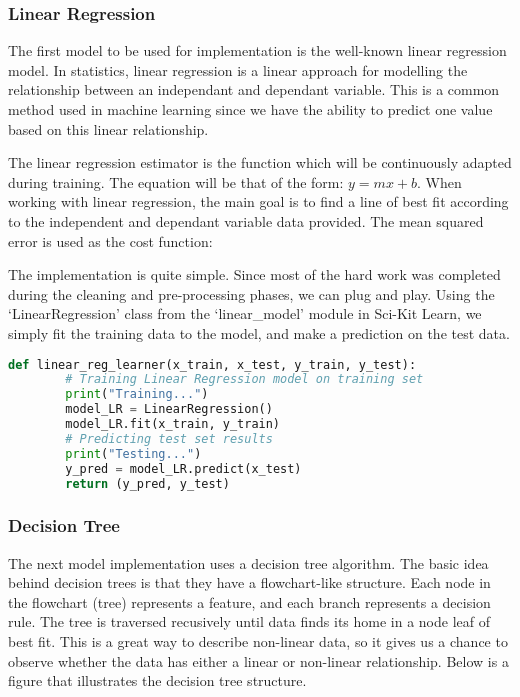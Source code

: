 \documentclass[12pt]{article}
\renewcommand{\baselinestretch}{2}
\begin{document}
        \subsubsection{Linear Regression}
        The first model to be used for implementation is the well-known linear regression model. In statistics, linear regression is a linear approach 
        for modelling the relationship between an independant and dependant variable. This is a common method used in machine learning since we have the 
        ability to predict one value based on this linear relationship. 

        The linear regression estimator is the function which will be continuously adapted during training. The equation will be that of the form: $y = mx + b$.
        When working with linear regression, the main goal is to find a line of best fit according to the independent and dependant variable data provided. The 
        mean squared error is used as the cost function:
        \begin{center}
            \Large {}
        \end{center}
        \normalsize

        The implementation is quite simple. Since most of the hard work was completed during the cleaning and pre-processing phases, we can plug 
        and play. Using the `LinearRegression' class from the `linear\_model' module in Sci-Kit Learn, we simply fit the training data to the model, and 
        make a prediction on the test data. 

        \renewcommand{\baselinestretch}{1.5}
        \begin{lstlisting}[language=Python, caption=Linear regression implementation]
    def linear_reg_learner(x_train, x_test, y_train, y_test):
        # Training Linear Regression model on training set
        print("Training...")
        model_LR = LinearRegression()
        model_LR.fit(x_train, y_train)
        # Predicting test set results
        print("Testing...")
        y_pred = model_LR.predict(x_test)
        return (y_pred, y_test)
        \end{lstlisting}
        \renewcommand{\baselinestretch}{2}

        \subsubsection{Decision Tree}
        The next model implementation uses a decision tree algorithm. The basic idea behind decision trees is that they have a flowchart-like structure. 
        Each node in the flowchart (tree) represents a feature, and each branch represents a decision rule. The tree is traversed recusively until data finds 
        its home in a node leaf of best fit. This is a great way to describe non-linear data, so it gives us a chance to observe whether the data has either a 
        linear or non-linear relationship. Below is a figure that illustrates the decision tree structure.
\end{document}
